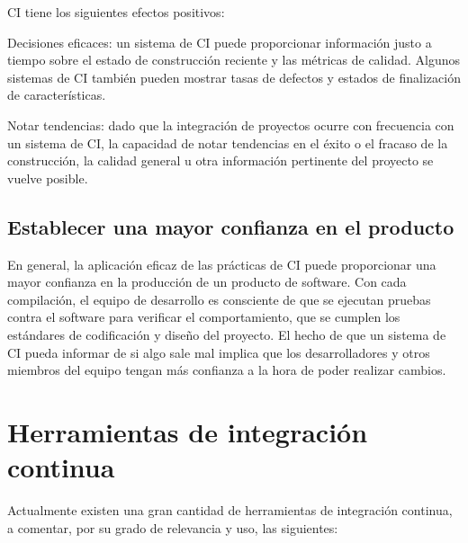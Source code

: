 CI tiene los siguientes efectos positivos:
\begin{compactitem}
    \item Decisiones eficaces: un sistema de CI puede proporcionar información justo a tiempo sobre el estado de construcción reciente y las métricas de calidad. Algunos sistemas de CI también pueden mostrar tasas de defectos y estados de finalización de características.
    \item Notar tendencias: dado que la integración de proyectos ocurre con frecuencia con un sistema de CI, la capacidad de notar tendencias en el éxito o el fracaso de la construcción, la calidad general u otra información pertinente del proyecto se vuelve posible.
\end{compactitem}
\subsection{Establecer una mayor confianza en el producto}
En general, la aplicación eficaz de las prácticas de CI puede proporcionar una mayor confianza en la producción de un producto de software. Con cada compilación, el equipo de desarrollo es consciente de que se ejecutan pruebas contra el software para verificar el comportamiento, que se cumplen los estándares de codificación y diseño del proyecto. El hecho de que un sistema de CI pueda informar de si algo sale mal implica que los desarrolladores y otros miembros del equipo tengan más confianza a la hora de poder realizar cambios.

\section{Herramientas de integración continua}
Actualmente existen una gran cantidad de herramientas de integración continua, a comentar, por su grado de relevancia y uso, las siguientes:


